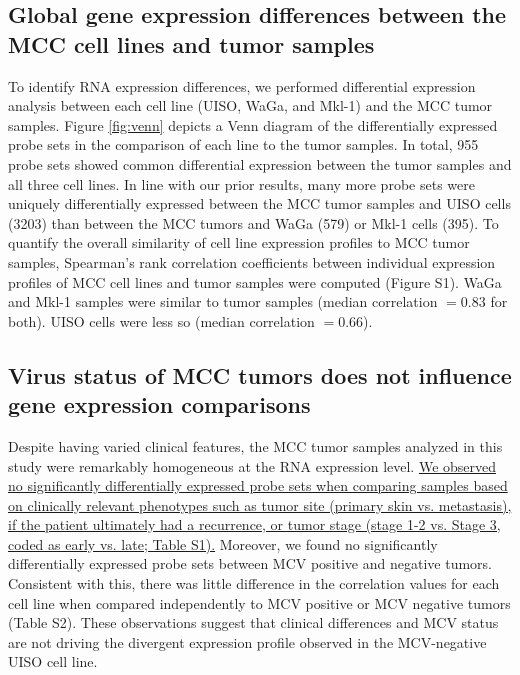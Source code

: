 \documentclass[10pt]{article}
\begin{document}
\subsection*{Global gene expression differences between the MCC cell lines and tumor samples}
To identify RNA expression differences, we performed differential expression analysis between each cell line (UISO, WaGa, and Mkl-1) and the MCC tumor samples.
Figure \ref{fig:venn} depicts a Venn diagram of the differentially expressed probe sets in the comparison of each line to the tumor samples.
In total, 955 probe sets showed common differential expression between the tumor samples and all three cell lines.
In line with our prior results, many more probe sets were uniquely differentially expressed between the MCC tumor samples and UISO cells (3203) than between the MCC tumors and WaGa (579) or Mkl-1 cells (395).
To quantify the overall similarity of cell line expression profiles to MCC tumor samples, Spearman's rank correlation coefficients between individual expression profiles of MCC cell lines and tumor samples were computed (Figure S1).
WaGa and Mkl-1 samples were similar to tumor samples (median correlation $=0.83$ for both).
UISO cells were less so (median correlation $=0.66$).

\subsection*{Virus status of MCC tumors does not influence gene expression comparisons}
Despite having varied clinical features, the MCC tumor samples analyzed in this study were remarkably homogeneous at the RNA expression level.
\uline{We observed no significantly differentially expressed probe sets when comparing samples based on clinically relevant phenotypes such as tumor site (primary skin vs. metastasis), if the patient ultimately had a recurrence, or tumor stage (stage 1-2 vs. Stage 3, coded as early vs. late; Table S1).}
Moreover, we found no significantly differentially expressed probe sets between MCV positive and negative tumors.
Consistent with this, there was little difference in the correlation values for each cell line when compared independently to MCV positive or MCV negative tumors (Table S2).
These observations suggest that clinical differences and MCV status are not driving the divergent expression profile observed in the MCV-negative \citep{Houben2010Merkel} UISO cell line.
\end{document}
